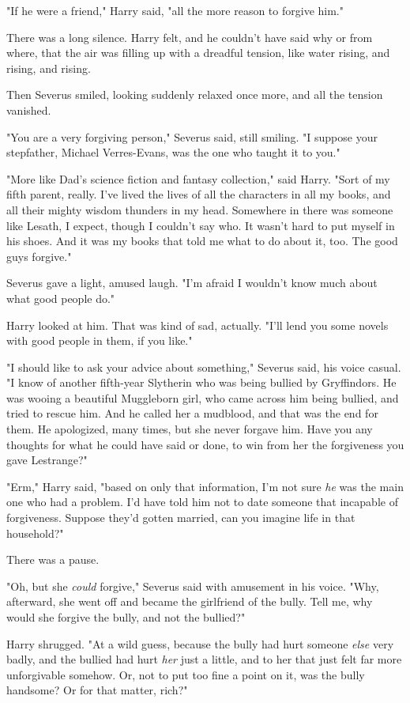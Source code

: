 "If he were a friend," Harry said, "all the more reason to forgive him."

There was a long silence. Harry felt, and he couldn't have said why or from
where, that the air was filling up with a dreadful tension, like water rising,
and rising, and rising.

Then Severus smiled, looking suddenly relaxed once more, and all the tension
vanished.

"You are a very forgiving person," Severus said, still smiling. "I suppose your
stepfather, Michael Verres-Evans, was the one who taught it to you."

"More like Dad's science fiction and fantasy collection," said Harry. "Sort of
my fifth parent, really. I've lived the lives of all the characters in all my
books, and all their mighty wisdom thunders in my head. Somewhere in there was
someone like Lesath, I expect, though I couldn't say who. It wasn't hard to put
myself in his shoes. And it was my books that told me what to do about it, too.
The good guys forgive."

Severus gave a light, amused laugh. "I'm afraid I wouldn't know much about what
good people do."

Harry looked at him. That was kind of sad, actually. "I'll lend you some novels
with good people in them, if you like."

"I should like to ask your advice about something," Severus said, his voice
casual. "I know of another fifth-year Slytherin who was being bullied by
Gryffindors. He was wooing a beautiful Muggleborn girl, who came across him
being bullied, and tried to rescue him. And he called her a mudblood, and that
was the end for them. He apologized, many times, but she never forgave him.
Have you any thoughts for what he could have said or done, to win from her the
forgiveness you gave Lestrange?"

"Erm," Harry said, "based on only that information, I'm not sure \emph{he} was
the main one who had a problem. I'd have told him not to date someone that
incapable of forgiveness. Suppose they'd gotten married, can you imagine life
in that household?"

There was a pause.

"Oh, but she \emph{could} forgive," Severus said with amusement in his voice.
"Why, afterward, she went off and became the girlfriend of the bully. Tell me,
why would she forgive the bully, and not the bullied?"

Harry shrugged. "At a wild guess, because the bully had hurt someone
\emph{else} very badly, and the bullied had hurt \emph{her} just a little, and
to her that just felt far more unforgivable somehow. Or, not to put too fine a
point on it, was the bully handsome? Or for that matter, rich?"

